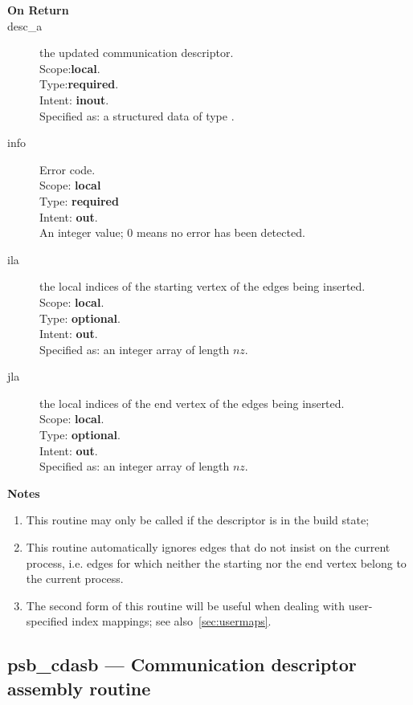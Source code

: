 \begin{description}
\item[\bf On Return]
\item[desc\_a] the updated communication descriptor.\\
Scope:{\bf local}.\\
Type:{\bf required}.\\
Intent: {\bf inout}.\\
Specified as: a structured data of type \descdata.
\item[info] Error code.\\
Scope: {\bf local} \\
Type: {\bf required} \\
Intent: {\bf out}.\\
An integer value; 0 means no error has been detected. 
\item[ila] the local indices of the starting vertex of the edges  being inserted.\\
Scope: {\bf local}.\\
Type: {\bf optional}.\\
Intent: {\bf out}.\\
Specified as: an integer array of length $nz$.
\item[jla]  the local indices of the end vertex of the edges  being inserted.\\
Scope: {\bf local}.\\
Type: {\bf optional}.\\
Intent: {\bf out}.\\
Specified as: an integer array of length $nz$.

\end{description}
{\par\noindent\large\bfseries Notes}
\begin{enumerate}
\item This routine may only be called if the descriptor is in the
  build state;
\item  This routine automatically ignores edges that do not
insist on the  current process, i.e. edges for which neither the starting
nor the end vertex belong to the current process.
\item The second form of this routine will be useful when dealing with
  user-specified index mappings; see also~\ref{sec:usermaps}.
\end{enumerate}



%
%
\clearpage\subsection*{psb\_cdasb --- Communication descriptor assembly
  routine}

